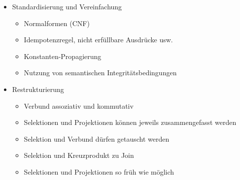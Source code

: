 \documentclass[11pt, paper=a4, twocolumn]{scrartcl}
\begin{document}
\begin{itemize}
\begin{itemize}
				\end{itemize}
			\item Standardisierung und Vereinfachung
				\begin{itemize}
					\item Normalformen (CNF)
					\item Idempotenzregel, nicht erfüllbare Ausdrücke 
						usw.
					\item Konstanten-Propagierung
					\item Nutzung von semantischen 
						Integritätsbedingungen
				\end{itemize}
			\item Restrukturierung
				\begin{itemize}
					\item Verbund assoziativ und kommutativ
					\item Selektionen und Projektionen können jeweils 
						zusammengefasst werden
					\item Selektion und Verbund dürfen getauscht 
						werden
					\item Selektion und Kreuzprodukt zu Join
					\item Selektionen und Projektionen so früh wie 
						möglich
				\end{itemize}
		\end{itemize}
	
\end{document}
